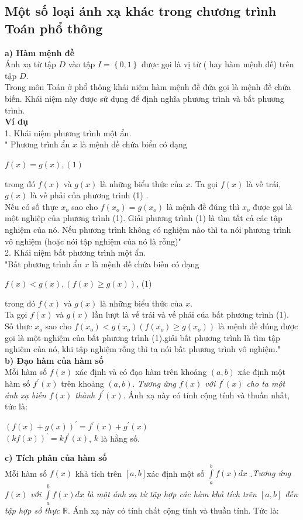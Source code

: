 \documentclass[12pt,oneside,a4paper,reqno]{book}
\begin{document}
\subsection{Một số loại ánh xạ khác trong chương trình Toán phổ thông}
\textbf{a) Hàm mệnh đề}\\
    Ánh xạ từ tập $D$ vào tập $I=\left\{0,1\right\}$ được gọi là vị từ ( hay hàm mệnh đề) trên tập $D$.\\
    Trong môn Toán ở phổ thông khái niệm hàm mệnh đề đứa gọi là mệnh đề chứa biến. Khái niệm này được sử dụng để định nghĩa phương trình và bất phương trình.\\
{\bf Ví dụ}\\
1. Khái niệm phương trình một ẩn.\\
" Phương trình ẩn $x$ là mệnh đề chứa biển có dạng\\
\begin{center}
$f(x)=g(x)  ,         (1)$
\end{center}
trong đó $f(x)$ và $g(x)$ là những biểu thức của $x$. Ta gọi $f(x)$ là vế trái, $g(x)$ là vế phải của phương trình (1) .\\
Nếu có số thực $x_o$ sao cho $f(x_o)=g(x_o)$ là mệnh đề đúng thì $x_o$ được gọi là một nghiệp của phương trình (1). Giải phương trình (1) là tìm tất cả các tập nghiệm của nó. Nếu phương trình không có nghiệm nào thì ta nói phương trình vô nghiệm (hoặc nói tập nghiệm của nó là rỗng)"\\
2. Khái niệm bất phương trình một ẩn.\\
"Bất phương trình ẩn $x$ là mệnh đề chứa biến có dạng\\
\begin{center}
$f(x)<g(x)         , (f(x) \ge g(x))$,          (1)
\end{center}
trong đó $f(x)$ và $g(x)$ là những biểu thức của $x$.\\
Ta gọi $f(x)$ và $g(x)$ lần lượt là vế trái và vế phải của bất phương trình (1). Số thực $x_o$ sao cho $f(x_o)<g(x_o) (f(x_o) \ge g(x_o))$ là mệnh đề đúng được gọi là một nghiệm của bất phương trình (1).giải bất phương trình là tìm tập nghiệm của nó, khi tập nghiệm rỗng thì ta nói bất phương trình vô nghiệm."\\
\textbf{b) Đạo hàm của hàm số}\\
Mỗi hàm số $f(x)$ xác định và có đạo hàm trên khoảng $(a,b)$ xác định một hàm số $f^{'}(x)$ trên khoảng $(a,b)$. \textit{Tương ứng $f(x)$ với $f^{'}(x)$ cho ta một ánh xạ biến $f(x)$ thành $f^{'}(x)$}. Ánh xạ này có tính cộng tính và thuần nhất, tức là:\\
\begin{center}
$(f(x)+g(x))^{'}=f^{'}(x)+g^{'}(x)$\\
$(kf(x))^{'}=kf^{'}(x)$, $k$ là hằng số.
\end{center}
\textbf{c) Tích phân của hàm số}\\
Mỗi hàm số $f(x)$ khả tích trên $\left[a,b\right]$xác định một số $\int\limits_a^b {f(x)dx}$ .\textit{Tương ứng $f(x)$ với $\int\limits_a^b {f(x)dx}$ là một ánh xạ từ tập hợp các hàm khả tích trên $\left[a,b\right]$ đến tập hợp số thực $\mathbb{R}$}. Ánh xạ này có tính chất cộng tính và thuần tính. Tức là:\\
\end{document}
